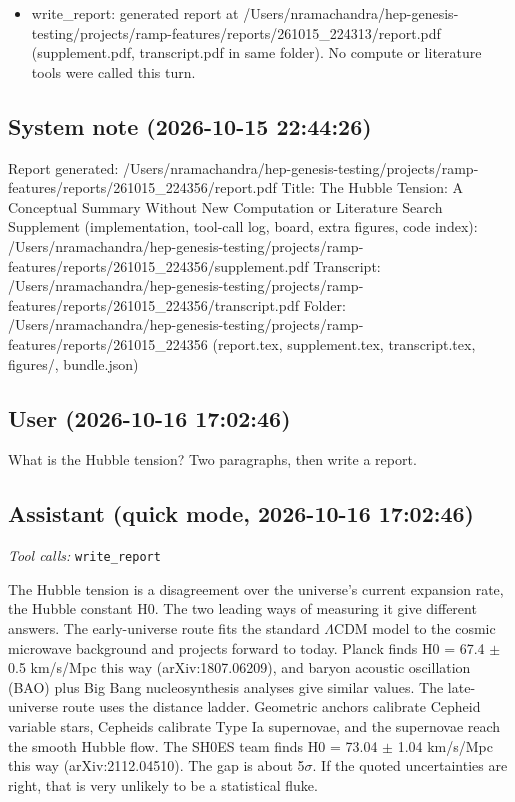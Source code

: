 \documentclass[11pt,a4paper]{article}
\begin{document}
\begin{itemize}
  \item write\_report: generated report at /Users/nramachandra/hep-genesis-testing/projects/ramp-features/reports/261015\_224313/report.pdf (supplement.pdf, transcript.pdf in same folder). No compute or literature tools were called this turn.
\end{itemize}
\subsection*{System note \small(2026-10-15 22:44:26)}
Report generated: /Users/nramachandra/hep-genesis-testing/projects/ramp-features/reports/261015\_224356/report.pdf Title: The Hubble Tension: A Conceptual Summary Without New Computation or Literature Search Supplement (implementation, tool-call log, board, extra figures, code index): /Users/nramachandra/hep-genesis-testing/projects/ramp-features/reports/261015\_224356/supplement.pdf Transcript: /Users/nramachandra/hep-genesis-testing/projects/ramp-features/reports/261015\_224356/transcript.pdf Folder: /Users/nramachandra/hep-genesis-testing/projects/ramp-features/reports/261015\_224356 (report.tex, supplement.tex, transcript.tex, figures/, bundle.json)

\subsection*{User \small(2026-10-16 17:02:46)}
What is the Hubble tension? Two paragraphs, then write a report.

\subsection*{Assistant \small(quick mode, 2026-10-16 17:02:46)}
\textit{Tool calls:} \texttt{write\_report}\par
The Hubble tension is a disagreement over the universe's current expansion rate, the Hubble constant H0. The two leading ways of measuring it give different answers. The early-universe route fits the standard $\Lambda$CDM model to the cosmic microwave background and projects forward to today. Planck finds H0 = 67.4 $\pm$ 0.5 km/s/Mpc this way (arXiv:1807.06209), and baryon acoustic oscillation (BAO) plus Big Bang nucleosynthesis analyses give similar values. The late-universe route uses the distance ladder. Geometric anchors calibrate Cepheid variable stars, Cepheids calibrate Type Ia supernovae, and the supernovae reach the smooth Hubble flow. The SH0ES team finds H0 = 73.04 $\pm$ 1.04 km/s/Mpc this way (arXiv:2112.04510). The gap is about 5$\sigma$. If the quoted uncertainties are right, that is very unlikely to be a statistical fluke.
\end{document}
